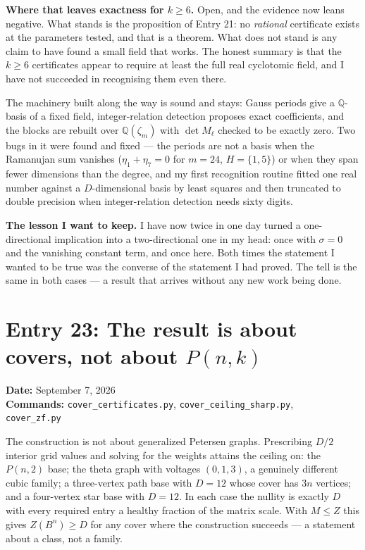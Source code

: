 \documentclass[12pt]{article}
\begin{document}
\textbf{Where that leaves exactness for $k\ge6$.} Open, and the evidence now
leans negative. What stands is the proposition of Entry 21: no \emph{rational}
certificate exists at the parameters tested, and that is a theorem. What does
not stand is any claim to have found a small field that works. The honest
summary is that the $k\ge6$ certificates appear to require at least the full
real cyclotomic field, and I have not succeeded in recognising them even there.

The machinery built along the way is sound and stays: Gauss periods give a
$\mathbb Q$-basis of a fixed field, integer-relation detection proposes exact
coefficients, and the blocks are rebuilt over $\mathbb Q(\zeta_m)$ with
$\det M_\ell$ checked to be exactly zero. Two bugs in it were found and fixed
--- the periods are not a basis when the Ramanujan sum vanishes ($\eta_1+\eta_7=0$
for $m=24$, $H=\{1,5\}$) or when they span fewer dimensions than the degree,
and my first recognition routine fitted one real number against a
$D$-dimensional basis by least squares and then truncated to double precision
when integer-relation detection needs sixty digits.

\textbf{The lesson I want to keep.} I have now twice in one day turned a
one-directional implication into a two-directional one in my head: once with
$\sigma=0$ and the vanishing constant term, and once here. Both times the
statement I wanted to be true was the converse of the statement I had proved.
The tell is the same in both cases --- a result that arrives without any new
work being done.


\clearpage
\section*{Entry 23: The result is about covers, not about $P(n,k)$}
\textbf{Date:} September 7, 2026\\
\textbf{Commands:} {\small\texttt{cover\_certificates.py},
\texttt{cover\_ceiling\_sharp.py},}\\
{\small\texttt{cover\_zf.py}}

The construction is not about generalized Petersen graphs. Prescribing
$D/2$ interior grid values and solving for the weights attains the ceiling on:
the $P(n,2)$ base; the theta graph with voltages $(0,1,3)$, a genuinely
different cubic family; a three-vertex path base with $D=12$ whose cover has
$3n$ vertices; and a four-vertex star base with $D=12$. In each case the
nullity is exactly $D$ with every required entry a healthy fraction of the
matrix scale. With $M\le Z$ this gives $Z(B^n)\ge D$ for any cover where the
construction succeeds --- a statement about a class, not a family.
\end{document}

